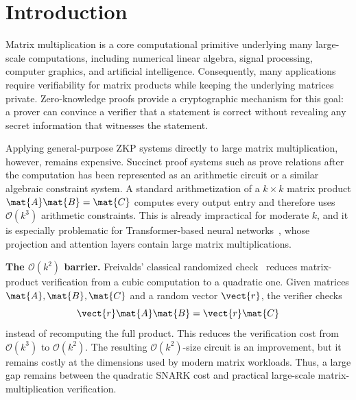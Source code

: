 \section{Introduction}
\label{sec:intro}

Matrix multiplication is a core computational primitive underlying many large-scale computations, including numerical linear algebra, signal processing, computer graphics, and artificial intelligence.  Consequently, many applications require verifiability for matrix products while keeping the underlying matrices private.  Zero-knowledge proofs provide a cryptographic mechanism for this goal:
a prover can convince a verifier that a statement is correct without revealing any secret information that witnesses the statement.

Applying general-purpose ZKP systems directly to large matrix multiplication,
however, remains expensive.  Succinct proof systems such as
\cite{groth2016size,plonk,maller2019sonic,chiesa2020marlin} prove relations
after the computation has been represented as an arithmetic circuit or a
similar algebraic constraint system.
A standard arithmetization of a \(k\times k\) matrix product \(\mat{A}\mat{B}=\mat{C}\) computes every output
entry and therefore uses \(\mathcal{O}(k^3)\) arithmetic constraints.  This is
already impractical for moderate \(k\), and it is especially problematic for
Transformer-based neural networks~\cite{transformer,bert,GPT3}, whose
projection and attention layers contain large matrix multiplications.

\noindent\textbf{The \(\mathcal{O}(k^2)\) barrier.}
Freivalds' classical randomized check~\cite{freivalds1977probabilistic} reduces
matrix-product verification from a cubic computation to a quadratic one.  Given
matrices \(\mat{A},\mat{B},\mat{C}\) and a random vector \(\vect{r}\), the
verifier checks
\[
  \vect{r}\mat{A}\mat{B}=\vect{r}\mat{C}
\]
instead of recomputing the full product.  This reduces the verification cost
from \(\mathcal{O}(k^3)\) to \(\mathcal{O}(k^2)\).  The resulting
\(\mathcal{O}(k^2)\)-size circuit is an improvement, but it remains costly at
the dimensions used by modern matrix workloads.  Thus, a large gap remains
between the quadratic SNARK cost and practical large-scale
matrix-multiplication verification.

